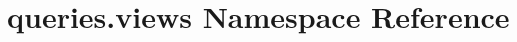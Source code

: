 \hypertarget{namespacequeries_1_1views}{\section{queries.\-views Namespace Reference}
\label{namespacequeries_1_1views}
}
